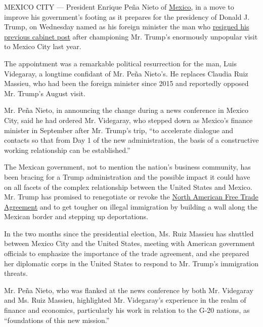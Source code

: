 MEXICO CITY --- President Enrique Peña Nieto of
\href{https://www.nytimes.com/topic/destination/mexico?8qa}{Mexico}, in
a move to improve his government's footing as it prepares for the
presidency of Donald J. Trump, on Wednesday named as his foreign
minister the man who
\href{https://www.nytimes.com/2016/09/08/world/americas/mexico-finance-minister-luis-videgaray-resigns.html?_r=0}{resigned
his previous cabinet post} after championing Mr. Trump's enormously
unpopular visit to Mexico City last year.

The appointment was a remarkable political resurrection for the man,
Luis Videgaray, a longtime confidant of Mr. Peña Nieto's. He replaces
Claudia Ruiz Massieu, who had been the foreign minister since 2015 and
reportedly opposed Mr. Trump's August visit.

Mr. Peña Nieto, in announcing the change during a news conference in
Mexico City, said he had ordered Mr. Videgaray, who stepped down as
Mexico's finance minister in September after Mr. Trump's trip, ``to
accelerate dialogue and contacts so that from Day 1 of the new
administration, the basis of a constructive working relationship can be
established.''

The Mexican government, not to mention the nation's business community,
has been bracing for a Trump administration and the possible impact it
could have on all facets of the complex relationship between the United
States and Mexico. Mr. Trump has promised to renegotiate or revoke the
\href{https://www.nytimes.com/2017/01/04/world/americas/mexico-donald-trump-nafta.html?hp\&action=click\&pgtype=Homepage\&clickSource=story-heading\&module=first-column-region\&region=top-news\&WT.nav=top-news}{North
American Free Trade Agreement} and to get tougher on illegal immigration
by building a wall along the Mexican border and stepping up
deportations.

In the two months since the presidential election, Ms. Ruiz Massieu has
shuttled between Mexico City and the United States, meeting with
American government officials to emphasize the importance of the trade
agreement, and she prepared her diplomatic corps in the United States to
respond to Mr. Trump's immigration threats.

Mr. Peña Nieto, who was flanked at the news conference by both Mr.
Videgaray and Ms. Ruiz Massieu, highlighted Mr. Videgaray's experience
in the realm of finance and economics, particularly his work in relation
to the G-20 nations, as ``foundations of this new mission.''


